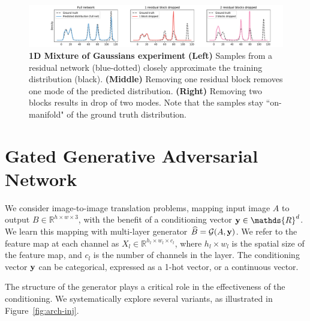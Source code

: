 
\begin{figure}[t]
    \centering
    \includegraphics[width=\linewidth,trim={2.2cm 0 1.8cm 0},clip]{paper_images/mog.pdf}
    \caption{{\bf 1D Mixture of Gaussians experiment} {\bf (Left)} Samples from a residual network (blue-dotted) closely approximate the training distribution (black). {\bf (Middle)} Removing one residual block removes one mode of the predicted distribution. {\bf (Right)} Removing two blocks results in drop of two modes. Note that the samples stay ``on-manifold" of the ground truth distribution.
    }\label{fig:onedexperiment}
\end{figure}

\section{Gated Generative Adversarial Network}
\label{sec:methods}
We consider image-to-image translation problems, mapping input image $A$ to output $B \in \mathds{R}^{h\times w\times 3}$, with the benefit of a conditioning vector ${\bf y} \in \mathds{R}^{d}$. We learn this mapping with multi-layer generator $\widehat{B}=\mathcal{G}(A,{\bf y})$. We refer to the feature map at each channel as $X_l\in \mathds{R}^{h_l\times w_l\times c_l}$, where $h_l \times w_l$ is the spatial size of the feature map, and $c_l$ is the number of channels in the layer. 
The conditioning vector ${\bf y}$ can be categorical, expressed as a 1-hot vector, or a continuous vector. 


The structure of the generator plays a critical role in the effectiveness of the conditioning. We systematically explore several variants, as illustrated in Figure~\ref{fig:arch-inj}. 



